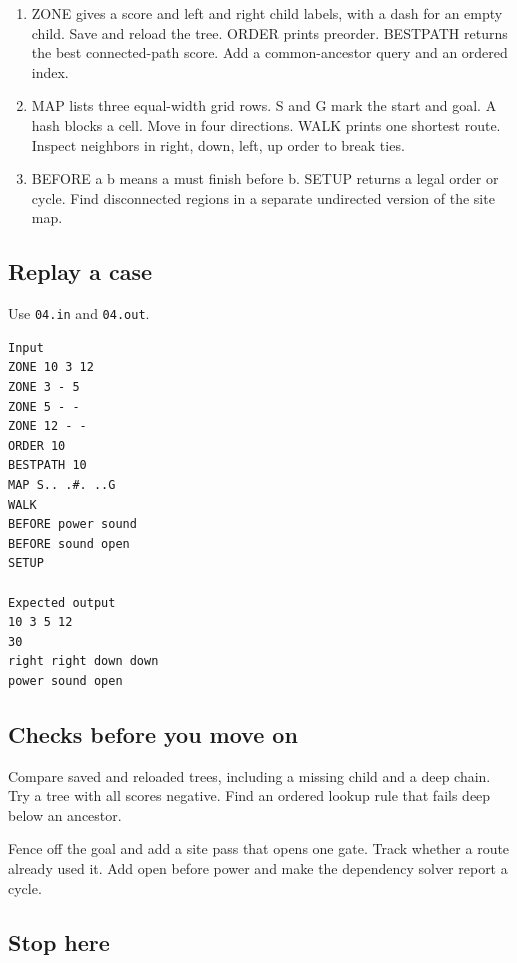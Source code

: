 \documentclass[11pt,letterpaper]{article}
\begin{document}
\begin{enumerate}
\item ZONE gives a score and left and right child labels, with a dash for an empty child. Save and reload the tree. ORDER prints preorder. BESTPATH returns the best connected-path score. Add a common-ancestor query and an ordered index.
\item MAP lists three equal-width grid rows. S and G mark the start and goal. A hash blocks a cell. Move in four directions. WALK prints one shortest route. Inspect neighbors in right, down, left, up order to break ties.
\item BEFORE a b means a must finish before b. SETUP returns a legal order or cycle. Find disconnected regions in a separate undirected version of the site map.
\end{enumerate}

\subsection*{Replay a case}

Use \texttt{04.in} and \texttt{04.out}.

\begin{samepage}
\small
\begin{verbatim}
Input
ZONE 10 3 12
ZONE 3 - 5
ZONE 5 - -
ZONE 12 - -
ORDER 10
BESTPATH 10
MAP S.. .#. ..G
WALK
BEFORE power sound
BEFORE sound open
SETUP

Expected output
10 3 5 12
30
right right down down
power sound open
\end{verbatim}
\end{samepage}

\subsection*{Checks before you move on}

Compare saved and reloaded trees, including a missing child and a deep chain. Try a tree with all scores negative. Find an ordered lookup rule that fails deep below an ancestor.

Fence off the goal and add a site pass that opens one gate. Track whether a route already used it. Add open before power and make the dependency solver report a cycle.

\subsection*{Stop here}
\end{document}
